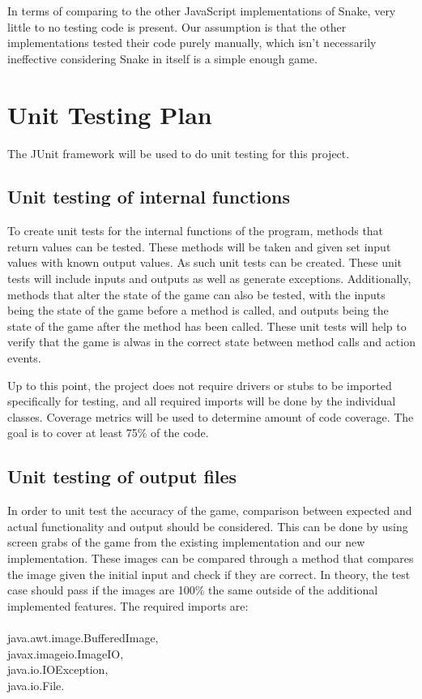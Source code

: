 \documentclass[12pt, titlepage]{article}
\begin{document}
In terms of comparing to the other JavaScript implementations of Snake, very little to no testing code is present. Our assumption is that the other implementations tested their code purely manually, which isn't necessarily ineffective considering Snake in itself is a simple enough game.
				
\section{Unit Testing Plan}
		
The JUnit framework will be used to do unit testing for this project. 
		
\subsection{Unit testing of internal functions}

To create unit tests for the internal functions of the program, methods that return values can be tested. These methods will be taken and given set input values with known output values. As such unit tests can be created. These unit tests will include inputs and outputs as well as generate exceptions. Additionally, methods that alter the state of the game can also be tested, with the inputs being the state of the game before a method is called, and outputs being the state of the game after the method has been called. These unit tests will help to verify that the game is alwas in the correct state between method calls and action events.

Up to this point, the project does not require drivers or stubs to be imported specifically for testing, and all required imports will be done by the individual classes. Coverage metrics will be used to determine amount of code coverage. The goal is to cover at least 75\% of the code.

\subsection{Unit testing of output files}

In order to unit test the accuracy of the game, comparison between expected and actual functionality and output should be considered. This can be done by using screen grabs of the game from the existing implementation and our new implementation. These images can be compared through a method that compares the image given the initial input and check if they are correct. In theory, the test case should pass if the images are 100\% the same outside of the additional implemented features. The required imports are:
\\\\
				java.awt.image.BufferedImage,
		\\		javax.imageio.ImageIO,
			\\	java.io.IOException,
			\\	java.io.File.
\end{document}

